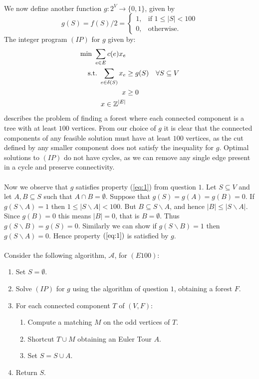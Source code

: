 \documentclass[letterpaper,12pt,oneside,onecolumn]{article}
\newcommand{\cA}{\mathcal{A}} \newcommand{\cB}{\mathcal{B}}
\begin{document}
\paragraph{}
We now define another function $g: 2^V \rightarrow \{0,1\}$, given by
$$g(S) = f(S)/2 = \begin{cases}
1, &\text{if } 1\leq |S| < 100 \\
0, &\text{otherwise.}
\end{cases}$$  
The integer program $(IP)$ for $g$ given by:
\begin{align*}
\min\ \sum_{e\in E} c(e) x_e&\\
\text{s.t.}\  \sum_{e\in\delta(S)} x_e &\geq g(S) &\forall S \subseteq V \\
x&\geq 0 \\
x\in \mathbb{Z}^{|E|}
\end{align*}
describes the problem of finding a forest where each connected component is a tree with at least $100$ vertices. From our choice of $g$ it is clear that the connected components of any feasible solution must have at least $100$ vertices, as the cut defined by any smaller component does not satisfy the inequality for $g$. Optimal solutions to $(IP)$ do not have cycles, as we can remove any single edge present in a cycle and preserve connectivity.
\paragraph{}
Now we observe that $g$ satisfies property (\ref{eq:1}) from question $1$. Let $S \subseteq V$ and let $A, B \subseteq S$ such that $A \cap B = \emptyset$. Suppose that $g(S)=g(A) = g(B) = 0$. If $g(S\backslash A) = 1$ then $1 \leq |S\backslash A| < 100$. But $B \subseteq S\backslash A$, and hence $|B| \leq |S\backslash A|$. Since $g(B) = 0$ this means $|B| = 0$, that is $B = \emptyset$. Thus $g(S\backslash B) = g(S) = 0$. Similarly we can show if $g(S\backslash B) = 1$ then $g(S\backslash A) = 0$.  Hence property $(\ref{eq:1})$ is satisfied by $g$.
\paragraph{}
Consider the following algorithm, $\cA$, for $(E100)$:
\begin{enumerate}
\item Set $S = \emptyset$.
\item Solve $(IP)$ for $g$ using the algorithm of question $1$, obtaining a forest $F$.
\item For each connected component $T$ of $(V,F)$:
	\begin{enumerate}
	\item Compute a matching $M$ on the odd vertices of $T$.
	\item Shortcut $T\cup M$ obtaining an Euler Tour $A$.
	\item Set $S = S \cup A$.
	\end{enumerate}
\item Return $S$.
\end{enumerate}
\end{document}
